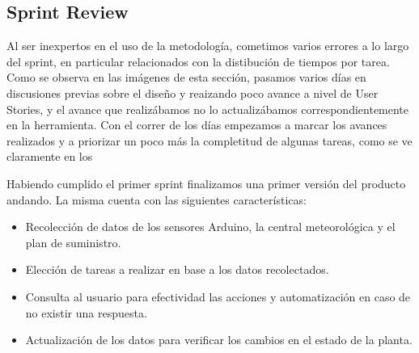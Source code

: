 \subsection{Sprint Review}
Al ser inexpertos en el uso de la metodología, cometimos varios errores a lo largo del sprint, en particular relacionados con la distibución de tiempos por tarea. Como se observa en las imágenes de esta sección, pasamos varios días en discusiones previas sobre el diseño y reaizando poco avance a nivel de User Stories, y el avance que realizábamos no lo actualizábamos correspondientemente en la herramienta.
Con el correr de los días empezamos a marcar los avances realizados y a priorizar un poco más la completitud de algunas tareas, como se ve claramente en los

Habiendo cumplido el primer sprint finalizamos una primer versión del producto andando. 
La misma cuenta con las siguientes características:
\begin{itemize}
\item Recolección de datos de los sensores Arduino, la central meteorológica y el plan de suministro.
\item Elección de tareas a realizar en base a los datos recolectados.
\item Consulta al usuario para efectividad las acciones y automatización en caso de no existir una respuesta.
\item Actualización de los datos para verificar los cambios en el estado de la planta.
\end{itemize}

